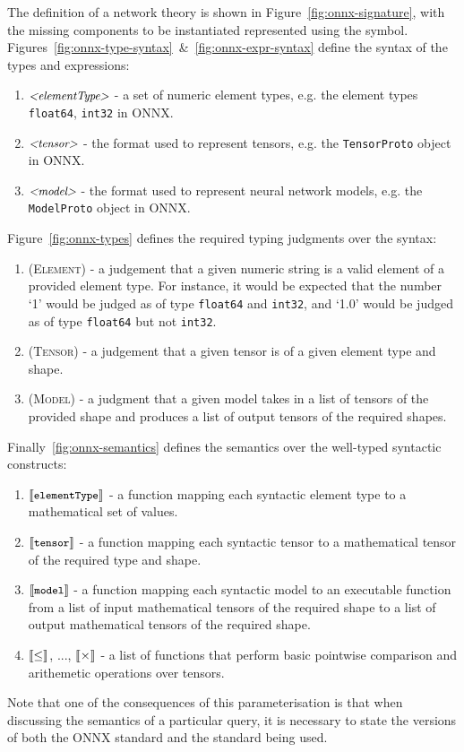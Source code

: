 The definition of a network theory is shown in Figure~\ref{fig:onnx-signature}, with the missing components to be instantiated represented using the \missing{} symbol.
Figures~\ref{fig:onnx-type-syntax}~\&~\ref{fig:onnx-expr-syntax} define the syntax of the types and expressions:
\begin{enumerate}
\item $\text{\small \textit{<elementType>}}$ - a set of numeric element types, e.g. the element types \texttt{float64}, \texttt{int32} in ONNX.
\item $\text{\small \textit{<tensor>}}$ - the format used to represent tensors, e.g. the \texttt{TensorProto} object in ONNX.
\item $\text{\small \textit{<model>}}$ - the format used to represent neural network models, e.g. the \texttt{ModelProto} object in ONNX.
\end{enumerate}
Figure~\ref{fig:onnx-types} defines the required typing judgments over the syntax:
\begin{enumerate}
\item \textsc{(Element)} - a judgement that a given numeric string is a valid element of a provided element type. For instance, it would be expected that the number `1' would be judged as of type \texttt{float64} and \texttt{int32}, and `1.0' would be judged as of type \texttt{float64} but not \texttt{int32}.
\item \textsc{(Tensor)} - a judgement that a given tensor is of a given element type and shape.
\item \textsc{(Model)} - a judgment that a given model takes in a list of tensors of the provided shape and produces a list of output tensors of the required shapes.
\end{enumerate}
Finally~\ref{fig:onnx-semantics} defines the semantics over the well-typed syntactic constructs:
\begin{enumerate}
\item $\llbracket \texttt{\small elementType} \rrbracket$ - a function mapping each syntactic element type to a mathematical set of values.
\item $\llbracket \texttt{\small tensor} \rrbracket$ - a function mapping each syntactic tensor to a mathematical tensor of the required type and shape.
\item $\llbracket \texttt{\small model} \rrbracket$ - a function mapping each syntactic model to an executable function from a list of input mathematical tensors of the required shape to a list of output mathematical tensors of the required shape.
\item $\llbracket \leq \rrbracket$, ..., $\llbracket \times \rrbracket$ - a list of functions that perform basic pointwise comparison and arithemetic operations over tensors.
\end{enumerate}
Note that one of the consequences of this parameterisation is that when discussing the semantics of a particular \vnnlib{} query, it is necessary to state the versions of both the ONNX standard and the \vnnlib{} standard being used.